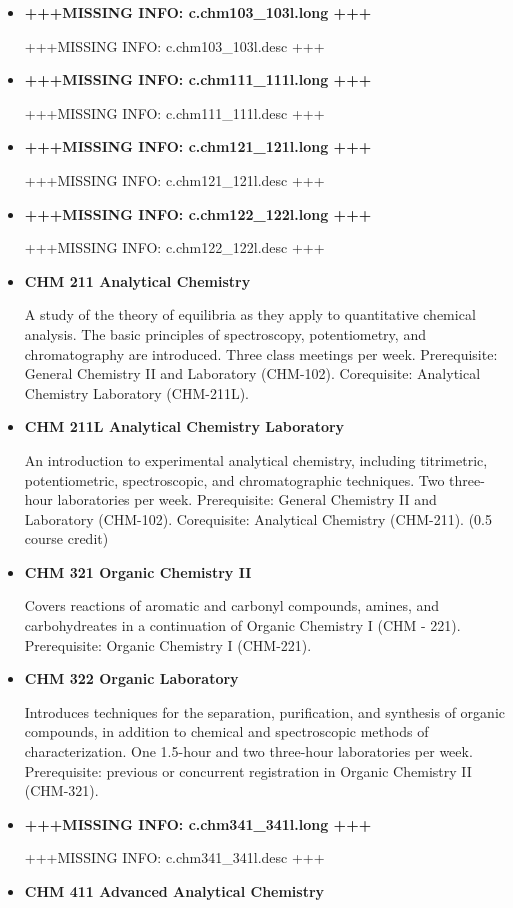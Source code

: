 \documentclass[
  letterpaper,
]{scrbook}
\begin{document}
\begin{itemize}
\item
  \textbf{+++MISSING INFO: c.chm103\_103l.long +++}

  +++MISSING INFO: c.chm103\_103l.desc +++
\item
  \textbf{+++MISSING INFO: c.chm111\_111l.long +++}

  +++MISSING INFO: c.chm111\_111l.desc +++
\item
  \textbf{+++MISSING INFO: c.chm121\_121l.long +++}

  +++MISSING INFO: c.chm121\_121l.desc +++
\item
  \textbf{+++MISSING INFO: c.chm122\_122l.long +++}

  +++MISSING INFO: c.chm122\_122l.desc +++
\item
  \textbf{CHM 211 Analytical Chemistry}

  A study of the theory of equilibria as they apply to quantitative
  chemical analysis. The basic principles of spectroscopy,
  potentiometry, and chromatography are introduced. Three class meetings
  per week. Prerequisite: General Chemistry II and Laboratory (CHM-102).
  Corequisite: Analytical Chemistry Laboratory (CHM-211L).
\item
  \textbf{CHM 211L Analytical Chemistry Laboratory}

  An introduction to experimental analytical chemistry, including
  titrimetric, potentiometric, spectroscopic, and chromatographic
  techniques. Two three-hour laboratories per week. Prerequisite:
  General Chemistry II and Laboratory (CHM-102). Corequisite: Analytical
  Chemistry (CHM-211). (0.5 course credit)
\item
  \textbf{CHM 321 Organic Chemistry II}

  Covers reactions of aromatic and carbonyl compounds, amines, and
  carbohydreates in a continuation of Organic Chemistry I (CHM - 221).
  Prerequisite: Organic Chemistry I (CHM-221).
\item
  \textbf{CHM 322 Organic Laboratory}

  Introduces techniques for the separation, purification, and synthesis
  of organic compounds, in addition to chemical and spectroscopic
  methods of characterization. One 1.5-hour and two three-hour
  laboratories per week. Prerequisite: previous or concurrent
  registration in Organic Chemistry II (CHM-321).
\item
  \textbf{+++MISSING INFO: c.chm341\_341l.long +++}

  +++MISSING INFO: c.chm341\_341l.desc +++
\item
  \textbf{CHM 411 Advanced Analytical Chemistry}


\end{itemize}
\end{document}
